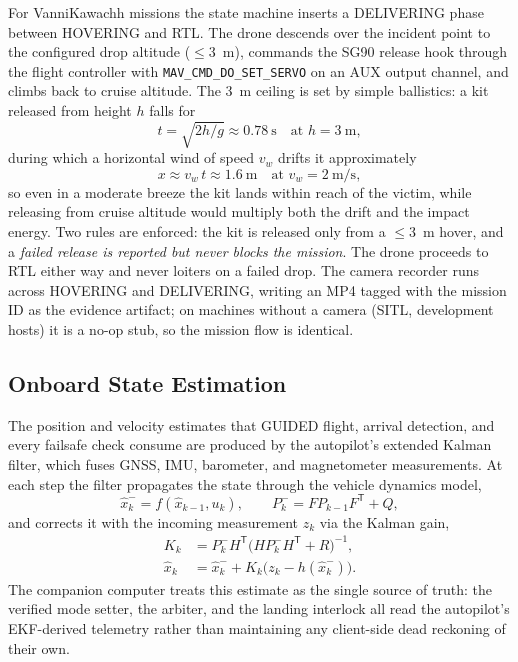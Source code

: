 \documentclass[journal]{IEEEtran}
\begin{document}
For VanniKawachh missions the state machine inserts a DELIVERING phase
between HOVERING and RTL. The drone descends over the incident point to the
configured drop altitude ($\leq$3~m), commands the SG90 release hook through
the flight controller with \texttt{MAV\_CMD\_DO\_SET\_SERVO} on an AUX
output channel, and climbs back to cruise altitude. The 3~m ceiling is set
by simple ballistics: a kit released from height $h$ falls for
\begin{equation}
\label{eq:falltime}
t = \sqrt{2h/g} \approx 0.78~\mathrm{s} \quad \text{at } h = 3~\mathrm{m},
\end{equation}
during which a horizontal wind of speed $v_w$ drifts it approximately
\begin{equation}
\label{eq:drift}
x \approx v_w\,t \approx 1.6~\mathrm{m} \quad \text{at } v_w =
2~\mathrm{m/s},
\end{equation}
so even in a moderate breeze the kit lands within reach of the victim,
while releasing from cruise altitude would multiply both the drift and the
impact energy. Two rules are enforced: the kit is released only from a
$\leq$3~m hover, and a \emph{failed release is reported but never blocks the
mission}. The drone proceeds to RTL either way and never loiters on a failed
drop. The camera recorder runs across HOVERING and DELIVERING, writing an
MP4 tagged with the mission ID as the evidence artifact; on machines without
a camera (SITL, development hosts) it is a no-op stub, so the mission flow
is identical.

\subsection{Onboard State Estimation}

The position and velocity estimates that GUIDED flight, arrival detection,
and every failsafe check consume are produced by the autopilot's extended
Kalman filter, which fuses GNSS, IMU, barometer, and magnetometer
measurements. At each step the filter propagates the state through the
vehicle dynamics model,
\begin{equation}
\label{eq:ekfpredict}
\hat{x}_k^{-} = f(\hat{x}_{k-1}, u_k), \qquad
P_k^{-} = F P_{k-1} F^{\mathsf{T}} + Q,
\end{equation}
and corrects it with the incoming measurement $z_k$ via the Kalman gain,
\begin{equation}
\label{eq:ekfupdate}
\begin{aligned}
K_k &= P_k^{-} H^{\mathsf{T}} \bigl(H P_k^{-} H^{\mathsf{T}} +
R\bigr)^{-1}, \\
\hat{x}_k &= \hat{x}_k^{-} + K_k \bigl(z_k - h(\hat{x}_k^{-})\bigr).
\end{aligned}
\end{equation}
The companion computer treats this estimate as the single
source of truth: the verified mode setter, the arbiter, and the landing
interlock all read the autopilot's EKF-derived telemetry rather than
maintaining any client-side dead reckoning of their own.
\end{document}
